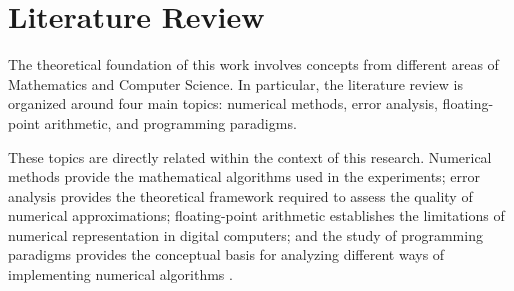 \chapter{Literature Review}
\label{cap:Literature_Review}

The theoretical foundation of this work involves concepts from different areas
of Mathematics and Computer Science. In particular, the literature review is
organized around four main topics: numerical methods, error analysis,
floating-point arithmetic, and programming paradigms.

These topics are directly related within the context of this research.
Numerical methods provide the mathematical algorithms used in the experiments;
error analysis provides the theoretical framework required to assess the
quality of numerical approximations; floating-point arithmetic establishes the
limitations of numerical representation in digital computers; and the study of
programming paradigms provides the conceptual basis for analyzing different
ways of implementing numerical algorithms
\cite{burden2016numerical,chapra2021numerical,higham2002accuracy}.
















